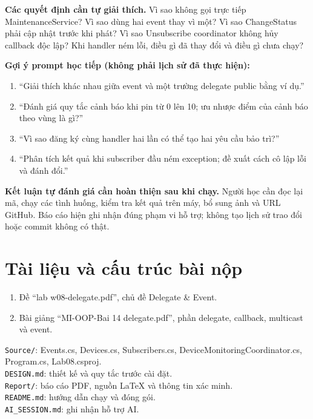 \documentclass[11pt,a4paper]{article}
\begin{document}
\textbf{Các quyết định cần tự giải thích.} Vì sao không gọi trực tiếp MaintenanceService? Vì sao dùng hai event thay vì một? Vì sao ChangeStatus phải cập nhật trước khi phát? Vì sao Unsubscribe coordinator không hủy callback độc lập? Khi handler ném lỗi, điều gì đã thay đổi và điều gì chưa chạy?

\textbf{Gợi ý prompt học tiếp (không phải lịch sử đã thực hiện):}
\begin{enumerate}
\item ``Giải thích khác nhau giữa event và một trường delegate public bằng ví dụ.''
\item ``Đánh giá quy tắc cảnh báo khi pin từ 0 lên 10; ưu nhược điểm của cảnh báo theo vùng là gì?''
\item ``Vì sao đăng ký cùng handler hai lần có thể tạo hai yêu cầu bảo trì?''
\item ``Phân tích kết quả khi subscriber đầu ném exception; đề xuất cách cô lập lỗi và đánh đổi.''
\end{enumerate}

\textbf{Kết luận tự đánh giá cần hoàn thiện sau khi chạy.} Người học cần đọc lại mã, chạy các tình huống, kiểm tra kết quả trên máy, bổ sung ảnh và URL GitHub. Báo cáo hiện ghi nhận đúng phạm vi hỗ trợ; không tạo lịch sử trao đổi hoặc commit không có thật.

\section{Tài liệu và cấu trúc bài nộp}
\begin{enumerate}
\item Đề ``lab w08-delegate.pdf'', chủ đề Delegate \& Event.
\item Bài giảng ``MI-OOP-Bai 14 delegate.pdf'', phần delegate, callback, multicast và event.
\end{enumerate}

\texttt{Source/}: Events.cs, Devices.cs, Subscribers.cs, DeviceMonitoringCoordinator.cs, Program.cs, Lab08.csproj.\\
\texttt{DESIGN.md}: thiết kế và quy tắc trước cài đặt.\\
\texttt{Report/}: báo cáo PDF, nguồn LaTeX và thông tin xác minh.\\
\texttt{README.md}: hướng dẫn chạy và đóng gói.\\
\texttt{AI\_SESSION.md}: ghi nhận hỗ trợ AI.
\end{document}
